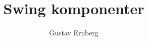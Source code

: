 \documentclass[10pt,a4paper,draft]{report}
\author{Gustav Ernberg}
\title{Swing komponenter}
\begin{document}
\maketitle
\section{}
\end{document}
